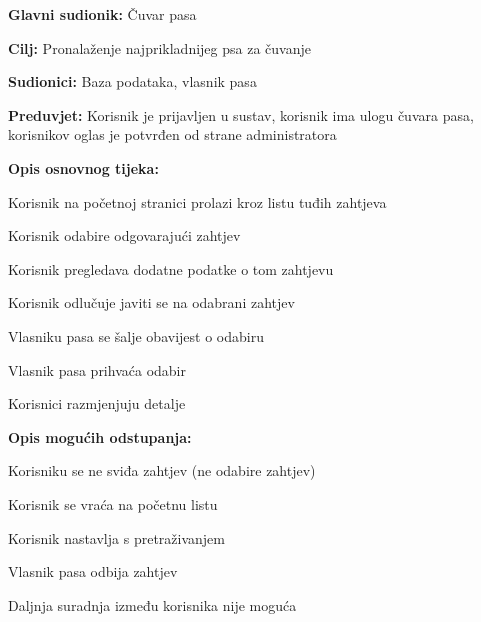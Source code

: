 					\noindent {}
					\begin{packed_item}
						
						\item \textbf{Glavni sudionik: } Čuvar pasa
						\item  \textbf{Cilj:} Pronalaženje najprikladnijeg psa za čuvanje
						\item  \textbf{Sudionici:} Baza podataka, vlasnik pasa
						\item  \textbf{Preduvjet:} Korisnik je prijavljen u sustav, korisnik ima ulogu čuvara pasa, korisnikov oglas je potvrđen od strane administratora
						\item  \textbf{Opis osnovnog tijeka:}
						
						\item[] \begin{packed_enum}
							
							\item Korisnik na početnoj stranici prolazi kroz listu tuđih zahtjeva   
							\item Korisnik odabire odgovarajući zahtjev
							\item Korisnik pregledava dodatne podatke o tom zahtjevu
							\item Korisnik odlučuje javiti se na odabrani zahtjev 
							\item Vlasniku pasa se šalje obavijest o odabiru
							\item Vlasnik pasa prihvaća odabir
							\item Korisnici razmjenjuju detalje
							
						\end{packed_enum}
						
						\item  \textbf{Opis mogućih odstupanja:}
						
						\item[] \begin{packed_item}
							
							\item[4.a] Korisniku se ne sviđa zahtjev (ne odabire zahtjev)
							\item[] \begin{packed_enum}
								
								\item Korisnik se vraća na početnu listu
								\item Korisnik nastavlja s pretraživanjem
								
							\end{packed_enum}
							
							\item[6.a] Vlasnik pasa odbija zahtjev 
							\item[] \begin{packed_enum}
								
								\item Daljnja suradnja između korisnika nije moguća
								
							\end{packed_enum}
						\end{packed_item}
					\end{packed_item}	
				
